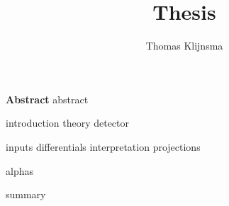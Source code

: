 \documentclass[draftmode]{main}
\begin{document}
\title{Thesis}
\author{Thomas Klijnsma}
\maketitle

\textbf{Abstract}
{abstract}


\tableofcontents


{introduction}
{theory}
{detector}

{inputs}
{differentials}
{interpretation}
{projections}

{alphas}

{summary}
\end{document}
